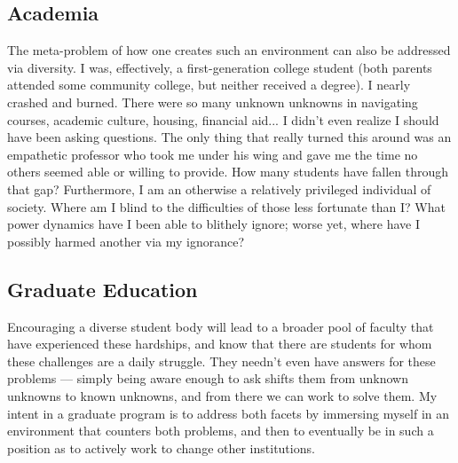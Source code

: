 \documentclass[letterpaper]{article}
\begin{document}
\subsection*{Academia}
The meta-problem of how one creates such an environment can also be addressed via diversity.
I was, effectively, a first-generation college student (both parents attended
some community college, but neither received a degree). I nearly crashed and burned. There
were so many unknown unknowns in navigating courses, academic culture, housing, financial aid...
I didn't even realize I should have been asking questions. The only thing that really turned
this around was an empathetic professor who took me under his wing and gave me the time no
others seemed able or willing to provide. How many students have fallen through that gap?
Furthermore, I am an otherwise a relatively privileged individual of society. Where am
I blind to the difficulties of those less fortunate than I? What power dynamics have I
been able to blithely ignore; worse yet, where have I possibly harmed another via my
ignorance?

\subsection*{Graduate Education}
Encouraging a diverse student body will lead to a broader pool of faculty that
have experienced these hardships, and know that there are students for whom these challenges
are a daily struggle. They needn't even have answers for these problems --- simply being
aware enough to ask shifts them from unknown unknowns to known unknowns, and from there
we can work to solve them. My intent in a graduate program is to address both
facets by immersing myself in an environment that counters both problems, and
then to eventually be in such a position as to actively work to change other
institutions.
\end{document}

